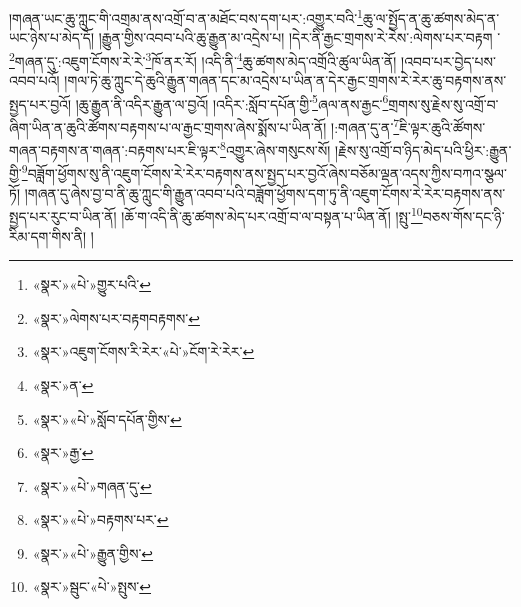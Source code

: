།གཞན་ཡང་ཆུ་ཀླུང་གི་འགྲམ་ནས་འགྲོ་བ་ན་མཐོང་བས་དག་པར་:འགྱུར་བའི་\footnote{«སྣར་»«པེ་»གྱུར་པའི་}ཆུ་ལ་སྤྱོད་ན་ཆུ་ཚགས་མེད་ན་ཡང་ཉེས་པ་མེད་དོ། །རྒྱུན་གྱིས་འབབ་པའི་ཆུ་རྒྱུན་མ་འདྲེས་པ། །དེར་ནི་རྒྱང་གྲགས་རེ་རེས་:ལེགས་པར་བརྟག ་\footnote{«སྣར་»ལེགས་པར་བརྟགབརྟགས་}གཞན་དུ་:འཇུག་ངོགས་རེ་རེ་\footnote{«སྣར་»འཇུག་ངོགས་རི་རེར་«པེ་»ངོག་རེ་རེར་}ཁོ་ནར་རོ། །འདི་ནི་\footnote{«སྣར་»ན་}ཆུ་ཚགས་མེད་འགྲོའི་ཚུལ་ཡིན་ནོ། །འབབ་པར་བྱེད་པས་འབབ་པའོ། །གལ་ཏེ་ཆུ་ཀླུང་དེ་ཆུའི་རྒྱུན་གཞན་དང་མ་འདྲེས་པ་ཡིན་ན་དེར་རྒྱང་གྲགས་རེ་རེར་ཆུ་བརྟགས་ནས་སྤྱད་པར་བྱའོ། །ཆུ་རྒྱུན་ནི་འདིར་རྒྱུན་ལ་བྱའོ། །འདིར་:སློབ་དཔོན་གྱི་\footnote{«སྣར་»«པེ་»སློབ་དཔོན་གྱིས་}ཞལ་ནས་རྒྱང་\footnote{«སྣར་»རྒྱ་}གྲགས་སུ་རྗེས་སུ་འགྲོ་བ་ཞིག་ཡིན་ན་ཆུའི་ཚོགས་བརྟགས་པ་ལ་རྒྱང་གྲགས་ཞེས་སྨོས་པ་ཡིན་ནོ། །:གཞན་དུ་ན་\footnote{«སྣར་»«པེ་»གཞན་དུ་}ཇི་ལྟར་ཆུའི་ཚོགས་གཞན་བརྟགས་ན་གཞན་:བརྟགས་པར་ཇི་ལྟར་\footnote{«སྣར་»«པེ་»བརྟགས་པར་}འགྱུར་ཞེས་གསུངས་སོ། །རྗེས་སུ་འགྲོ་བ་ཉིད་མེད་པའི་ཕྱིར་:རྒྱུན་གྱི་\footnote{«སྣར་»«པེ་»རྒྱུན་གྱིས་}བཟློག་ཕྱོགས་སུ་ནི་འཇུག་ངོགས་རེ་རེར་བརྟགས་ནས་སྤྱད་པར་བྱའོ་ཞེས་བཅོམ་ལྡན་འདས་ཀྱིས་བཀའ་སྩལ་ཏོ། །གཞན་དུ་ཞེས་བྱ་བ་ནི་ཆུ་ཀླུང་གི་རྒྱུན་འབབ་པའི་བཟློག་ཕྱོགས་དག་ཏུ་ནི་འཇུག་ངོགས་རེ་རེར་བརྟགས་ནས་སྤྱད་པར་རུང་བ་ཡིན་ནོ། །ཆོ་ག་འདི་ནི་ཆུ་ཚགས་མེད་པར་འགྲོ་བ་ལ་བསྟན་པ་ཡིན་ནོ། །སྤུ་\footnote{«སྣར་»སྦུང་«པེ་»སྤུས་}བཅས་གོས་དང་ཉི་རིམ་དག་གིས་ནི། །
